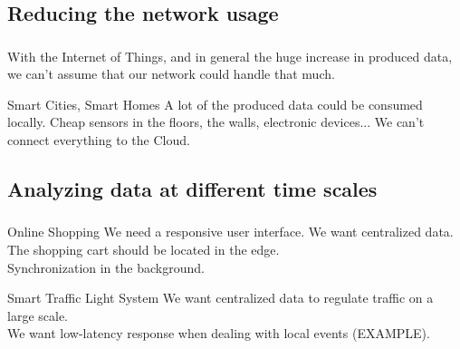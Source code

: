 \documentclass[utf8,xcolor=table, page number]{earlywinter}
\begin{document}
\subsection{Reducing the network usage}
\begin{frame}
  \frametitle{\secname}
  \framesubtitle{\subsecname}

  With the Internet of Things, and in general the huge increase in produced data, we can't assume that our network could handle that much.

  \begin{exampleblock}{Smart Cities, Smart Homes}
    A lot of the produced data could be consumed locally. Cheap sensors in the floors, the walls, electronic devices... We can't connect everything to the Cloud.
  \end{exampleblock}
  
\end{frame}


\subsection{Analyzing data at different time scales}
\begin{frame}
  \frametitle{\secname}
  \framesubtitle{\subsecname}

  \begin{exampleblock}{Online Shopping}
    We need a responsive user interface. We want centralized data.\\
    The shopping cart should be located in the edge.\\
    Synchronization in the background.
  \end{exampleblock}

  \begin{exampleblock}{Smart Traffic Light System}
    We want centralized data to regulate traffic on a large scale.\\
    We want low-latency response when dealing with local events (EXAMPLE).
  \end{exampleblock}
  
\end{frame}
\end{document}
